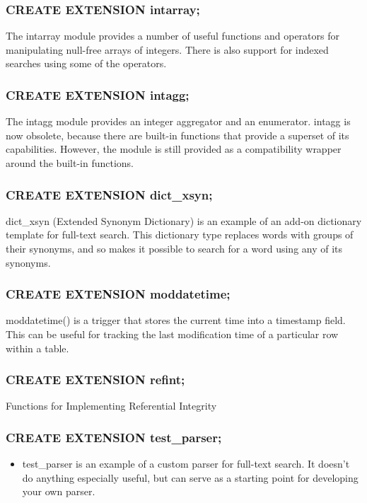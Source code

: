 \documentclass[utf8,hyperref={pdftex,colorlinks,linkcolor=black,citecolor=black,urlcolor=black,filecolor=black,plainpages=false},xcolor=table,hyperref]{beamer}
\begin{document}
\begin{frame}[containsverbatim]
	\frametitle{CREATE EXTENSION intarray;}
	The intarray module provides a number of useful functions and operators for manipulating null-free arrays of integers. There is also support for indexed searches using some of the operators. 
\end{frame}

\begin{frame}[containsverbatim]
	\frametitle{CREATE EXTENSION intagg;}
	The intagg module provides an integer aggregator and an enumerator. intagg is now obsolete, because there are built-in functions that provide a superset of its capabilities. However, the module is still provided as a compatibility wrapper around the built-in functions. 
\end{frame}

\begin{frame}[containsverbatim]
	\frametitle{CREATE EXTENSION dict_xsyn;}
	dict_xsyn (Extended Synonym Dictionary) is an example of an add-on dictionary template for full-text search. This dictionary type replaces words with groups of their synonyms, and so makes it possible to search for a word using any of its synonyms. 
\end{frame}

\begin{frame}[containsverbatim]
	\frametitle{CREATE EXTENSION moddatetime;}
	moddatetime() is a trigger that stores the current time into a timestamp field. This can be useful for tracking the last modification time of a particular row within a table. 
\end{frame}

\begin{frame}[containsverbatim]
	\frametitle{CREATE EXTENSION refint;}
	Functions for Implementing Referential Integrity
\end{frame}

\begin{frame}[containsverbatim]
	\frametitle{CREATE EXTENSION test_parser;}
	\begin{itemize}
		\item test_parser is an example of a custom parser for full-text search. It doesn't do anything especially useful, but can serve as a starting point for developing your own parser. 
	\end{itemize} 
\end{frame}
\end{document}
